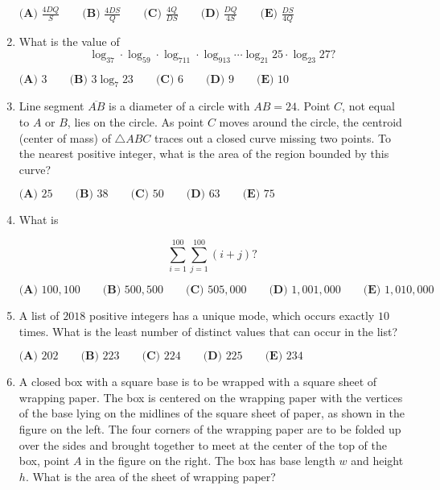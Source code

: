 \documentclass{article}
\begin{document}
\begin{enumerate}[label=\arabic*., itemsep=0.5em]
$\textbf{(A) } \frac{4DQ}{S} \qquad \textbf{(B) } \frac{4DS}{Q} \qquad \textbf{(C) } \frac{4Q}{DS} \qquad \textbf{(D) } \frac{DQ}{4S} \qquad \textbf{(E) } \frac{DS}{4Q}$\par \vspace{0.5em}\item What is the value of 
\begin{equation*}
\log_37\cdot\log_59\cdot\log_711\cdot\log_913\cdots\log_{21}25\cdot\log_{23}27?
\end{equation*}

$\textbf{(A) } 3 \qquad \textbf{(B) } 3\log_{7}23 \qquad \textbf{(C) } 6 \qquad \textbf{(D) } 9 \qquad \textbf{(E) } 10 $\par \vspace{0.5em}\item Line segment $\overline{AB}$ is a diameter of a circle with $AB = 24$. Point $C$, not equal to $A$ or $B$, lies on the circle. As point $C$ moves around the circle, the centroid (center of mass) of $\triangle ABC$ traces out a closed curve missing two points. To the nearest positive integer, what is the area of the region bounded by this curve?

$\textbf{(A) } 25 \qquad \textbf{(B) } 38  \qquad \textbf{(C) } 50  \qquad \textbf{(D) } 63 \qquad \textbf{(E) } 75  $\par \vspace{0.5em}\item What is

\begin{equation*}
\sum^{100}_{i=1} \sum^{100}_{j=1} (i+j) ?
\end{equation*}


$ \textbf{(A) }100{,}100 \qquad
\textbf{(B) }500{,}500\qquad
\textbf{(C) }505{,}000 \qquad
\textbf{(D) }1{,}001{,}000 \qquad
\textbf{(E) }1{,}010{,}000 \qquad $\par \vspace{0.5em}\item A list of $2018$ positive integers has a unique mode, which occurs exactly $10$ times. What is the least number of distinct values that can occur in the list?

$ \textbf{(A) }202 \qquad
\textbf{(B) }223 \qquad
\textbf{(C) }224 \qquad
\textbf{(D) }225 \qquad
\textbf{(E) }234 \qquad $\par \vspace{0.5em}\item A closed box with a square base is to be wrapped with a square sheet of wrapping paper. The box is centered on the wrapping paper with the vertices of the base lying on the midlines of the square sheet of paper, as shown in the figure on the left. The four corners of the wrapping paper are to be folded up over the sides and brought together to meet at the center of the top of the box, point $A$ in the figure on the right. The box has base length $w$ and height $h$. What is the area of the sheet of wrapping paper?



\end{enumerate}
\end{document}
